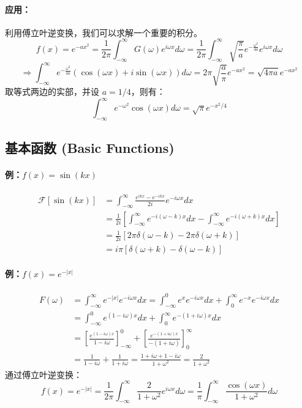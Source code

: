 \documentclass{article}
\begin{document}
	\paragraph{应用：} 利用傅立叶逆变换，我们可以求解一个重要的积分。
	$$ 
	f(x) = e^{-ax^2} = \frac{1}{2\pi} \int_{-\infty}^{\infty} G(\omega) e^{i\omega x} d\omega = \frac{1}{2\pi} \int_{-\infty}^{\infty} \sqrt{\frac{\pi}{a}} e^{-\frac{\omega^2}{4a}} e^{i\omega x} d\omega 
	$$
	$$ 
	\Rightarrow \int_{-\infty}^{\infty} e^{-\frac{\omega^2}{4a}} (\cos(\omega x) + i\sin(\omega x)) d\omega = 2\pi \sqrt{\frac{a}{\pi}} e^{-ax^2} = \sqrt{4\pi a} e^{-ax^2} 
	$$
	取等式两边的实部，并设 $a=1/4$，则有：
	$$ 
	\int_{-\infty}^{\infty} e^{-\omega^2} \cos(\omega x) d\omega = \sqrt{\pi} e^{-x^2/4} 
	$$
	
	\subsection{基本函数 (Basic Functions)}
	\paragraph{例：$f(x) = \sin(kx)$}
	\begin{align*}
		\mathcal{F}[\sin(kx)] &= \int_{-\infty}^{\infty} \frac{e^{ikx}-e^{-ikx}}{2i} e^{-i\omega x} dx \\
		&= \frac{1}{2i} \left[ \int_{-\infty}^{\infty} e^{-i(\omega-k)x} dx - \int_{-\infty}^{\infty} e^{-i(\omega+k)x} dx \right] \\
		&= \frac{1}{2i} [2\pi \delta(\omega-k) - 2\pi \delta(\omega+k)] \\
		&= i\pi [\delta(\omega+k) - \delta(\omega-k)]
	\end{align*}
	
	\paragraph{例：$f(x) = e^{-|x|}$}
	\begin{align*}
		F(\omega) &= \int_{-\infty}^{\infty} e^{-|x|} e^{-i\omega x} dx = \int_{-\infty}^{0} e^{x} e^{-i\omega x} dx + \int_{0}^{\infty} e^{-x} e^{-i\omega x} dx \\
		&= \int_{-\infty}^{0} e^{(1-i\omega)x} dx + \int_{0}^{\infty} e^{-(1+i\omega)x} dx \\
		&= \left[ \frac{e^{(1-i\omega)x}}{1-i\omega} \right]_{-\infty}^0 + \left[ \frac{e^{-(1+i\omega)x}}{-(1+i\omega)} \right]_0^{\infty} \\
		&= \frac{1}{1-i\omega} + \frac{1}{1+i\omega} = \frac{1+i\omega+1-i\omega}{1+\omega^2} = \frac{2}{1+\omega^2}
	\end{align*}
	通过傅立叶逆变换：
	$$ 
	f(x) = e^{-|x|} = \frac{1}{2\pi} \int_{-\infty}^{\infty} \frac{2}{1+\omega^2} e^{i\omega x} d\omega = \frac{1}{\pi} \int_{-\infty}^{\infty} \frac{\cos(\omega x)}{1+\omega^2} d\omega 
	$$
	
\end{document}
